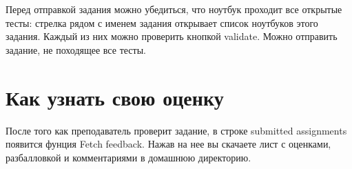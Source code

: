 \documentclass[a4paper,12pt]{article}
\begin{document}
Перед отправкой задания можно убедиться, что ноутбук проходит все открытые тесты: стрелка рядом с именем задания открывает список ноутбуков этого задания. Каждый из них можно проверить кнопкой validate. Можно отправить задание, не походящее все тесты.

\section{Как узнать свою оценку}

После того как преподаватель проверит задание, в строке submitted assignments появится фунция Fetch feedback. Нажав на нее вы скачаете лист с оценками, разбалловкой и комментариями в домашнюю директорию.
\end{document}
